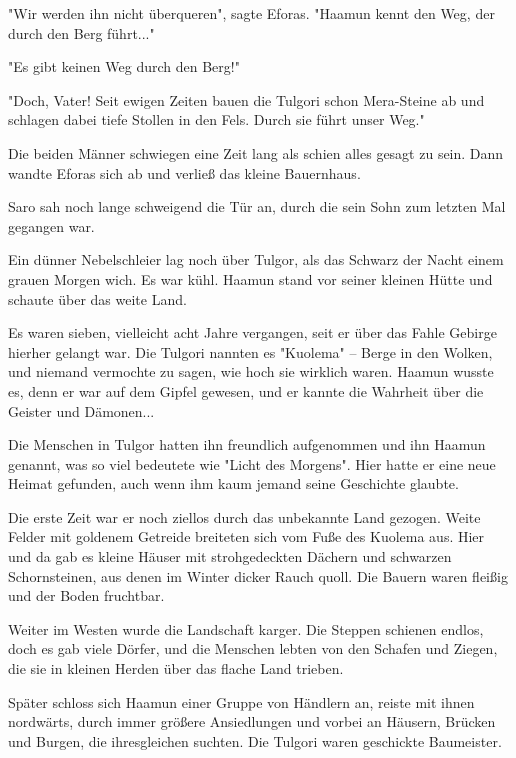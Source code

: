 \documentclass[10pt, a4paper, oneside]{book}
\begin{document}
\begin{multicols}{2}
"Wir werden ihn nicht überqueren", sagte Eforas. "Haamun kennt den Weg, der durch den Berg führt..."

"Es gibt keinen Weg durch den Berg!"

"Doch, Vater! Seit ewigen Zeiten bauen die Tulgori schon Mera-Steine ab und schlagen dabei tiefe Stollen in den Fels. Durch sie führt unser Weg."

Die beiden Männer schwiegen eine Zeit lang als schien alles gesagt zu sein. Dann wandte Eforas sich ab und verließ das kleine Bauernhaus.

Saro sah noch lange schweigend die Tür an, durch die sein Sohn zum letzten Mal gegangen war.\bigskip

Ein dünner Nebelschleier lag noch über Tulgor, als das Schwarz der Nacht einem grauen Morgen wich. Es war kühl. Haamun stand vor seiner kleinen Hütte und schaute über das weite Land.

Es waren sieben, vielleicht acht Jahre vergangen, seit er über das Fahle Gebirge hierher gelangt war. Die  Tulgori nannten es "Kuolema" – Berge in den Wolken, und niemand vermochte zu sagen, wie hoch sie wirklich waren. Haamun wusste es, denn er war auf dem Gipfel gewesen, und er kannte die Wahrheit über die Geister und Dämonen...

Die Menschen in Tulgor hatten ihn freundlich aufgenommen und ihn Haamun genannt, was so viel bedeutete wie "Licht des Morgens". Hier hatte er eine neue Heimat gefunden, auch wenn ihm kaum jemand seine Geschichte glaubte.\bigskip

Die erste Zeit war er noch ziellos durch das unbekannte Land gezogen. Weite Felder mit goldenem Getreide breiteten sich vom Fuße des Kuolema aus. Hier und da gab es kleine Häuser mit strohgedeckten Dächern und schwarzen Schornsteinen, aus denen im Winter dicker Rauch quoll. Die Bauern waren fleißig und der Boden fruchtbar.

Weiter im Westen wurde die Landschaft karger. Die Steppen schienen endlos, doch es gab viele Dörfer, und die Menschen lebten von den Schafen und Ziegen, die sie in kleinen Herden über das flache Land trieben.\bigskip

Später schloss sich Haamun einer Gruppe von Händlern an, reiste mit ihnen nordwärts, durch immer größere Ansiedlungen und vorbei an Häusern, Brücken und Burgen, die ihresgleichen suchten. Die Tulgori waren geschickte Baumeister.


\end{multicols}
\end{document}
